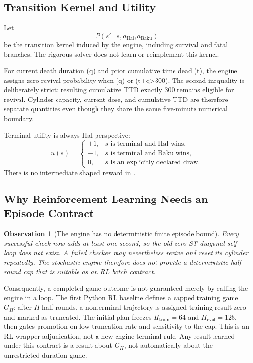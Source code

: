 \documentclass[11pt]{article}
\newtheorem{observation}{Observation}
\newcommand{\hal}{\mathrm{Hal}}
\newcommand{\baku}{\mathrm{Baku}}
\begin{document}
\subsection{Transition Kernel and Utility}

Let
\[
P(s'\mid s,a_{\hal},a_{\baku})
\]
be the transition kernel induced by the engine, including survival and fatal
branches. The rigorous solver does not learn or reimplement this kernel.

For current death duration (q) and prior cumulative time dead (t), the
engine assigns zero revival probability when (q) or (t+q>300).
The second inequality is deliberately strict: resulting cumulative TTD exactly
300 remains eligible for revival. Cylinder capacity, current dose, and
cumulative TTD are therefore separate quantities even though they share the
same five-minute numerical boundary.

Terminal utility is always Hal-perspective:
\[
u(s)=
\begin{cases}
+1, & s\text{ is terminal and Hal wins},\\
-1, & s\text{ is terminal and Baku wins},\\
0, & s\text{ is an explicitly declared draw}.
\end{cases}
\]
There is no intermediate shaped reward in .

\subsection{Why Reinforcement Learning Needs an Episode Contract}

\begin{observation}[The engine has no deterministic finite episode bound]
Every successful check now adds at least one second, so the old zero-ST
diagonal self-loop does not exist. A failed checker may nevertheless revive
and reset its cylinder repeatedly. The stochastic engine therefore does not
provide a deterministic half-round cap that is suitable as an RL batch
contract.
\end{observation}

Consequently, a completed-game outcome is not guaranteed merely by calling
the engine in a loop. The first Python RL baseline defines a capped training
game \(G_H\): after \(H\) half-rounds, a nonterminal trajectory is assigned
training result zero and marked as truncated. The initial plan freezes
\(H_{\mathrm{train}}=64\) and \(H_{\mathrm{eval}}=128\), then gates promotion
on low truncation rate and sensitivity to the cap. This is an RL-wrapper
adjudication, not a new engine terminal rule. Any result learned under this
contract is a result about \(G_H\), not automatically about the
unrestricted-duration game.
\end{document}
